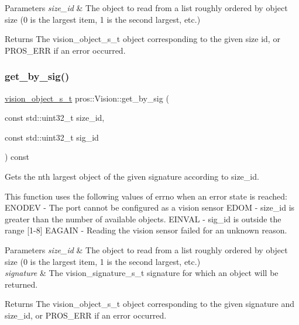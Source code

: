 \begin{DoxyParams}{Parameters}
{\em size\+\_\+id} & The object to read from a list roughly ordered by object size (0 is the largest item, 1 is the second largest, etc.)\\
\hline
\end{DoxyParams}
\begin{DoxyReturn}{Returns}
The vision\+\_\+object\+\_\+s\+\_\+t object corresponding to the given size id, or P\+R\+O\+S\+\_\+\+E\+RR if an error occurred. 
\end{DoxyReturn}
\mbox{\label{classpros_1_1Vision_a10fd89ed3c5e8fe5ce25046a877c7d84}} 
\subsubsection{\texorpdfstring{get\+\_\+by\+\_\+sig()}{get\_by\_sig()}}
{\footnotesize\ttfamily \hyperlink{vision_8h_ae619120558539c13e53b5a6f42fb4375}{vision\+\_\+object\+\_\+s\+\_\+t} pros\+::\+Vision\+::get\+\_\+by\+\_\+sig (\begin{DoxyParamCaption}\item[{const std\+::uint32\+\_\+t}]{size\+\_\+id,  }\item[{const std\+::uint32\+\_\+t}]{sig\+\_\+id }\end{DoxyParamCaption}) const}



Gets the nth largest object of the given signature according to size\+\_\+id. 

This function uses the following values of errno when an error state is reached\+: E\+N\+O\+D\+EV -\/ The port cannot be configured as a vision sensor E\+D\+OM -\/ size\+\_\+id is greater than the number of available objects. E\+I\+N\+V\+AL -\/ sig\+\_\+id is outside the range \mbox{[}1-\/8\mbox{]} E\+A\+G\+A\+IN -\/ Reading the vision sensor failed for an unknown reason.


\begin{DoxyParams}{Parameters}
{\em size\+\_\+id} & The object to read from a list roughly ordered by object size (0 is the largest item, 1 is the second largest, etc.) \\
\hline
{\em signature} & The vision\+\_\+signature\+\_\+s\+\_\+t signature for which an object will be returned.\\
\hline
\end{DoxyParams}
\begin{DoxyReturn}{Returns}
The vision\+\_\+object\+\_\+s\+\_\+t object corresponding to the given signature and size\+\_\+id, or P\+R\+O\+S\+\_\+\+E\+RR if an error occurred. 
\end{DoxyReturn}
\mbox{\label{classpros_1_1Vision_a4b96f92a2ae2f29fd37709958f48e514}} 
